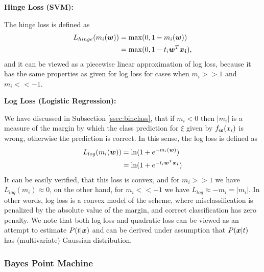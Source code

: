 {\bf Hinge Loss (SVM):}

The hinge loss is defined as
\[ \begin{split}
L_{hinge}(m_i(\boldsymbol{w})) &= \max(0, 1 - m_i(\boldsymbol{w})) \\
&= \max(0, 1 - t_i \boldsymbol{w}^T \boldsymbol{x_i}),
\end{split} \] 
and it can be viewed as a piecewise linear approximation of log loss,
because it has the same properties as given for log loss for cases
when $m_i >> 1$ and $m_i << -1$.

{\bf Log Loss (Logistic Regression):}

We have discussed in Subsection \ref{ssec:binclass}, that if $m_i < 0$
then $|m_i|$ is a measure of the margin by which the class prediction
for $\xi$ given by $f_{\boldsymbol{w}}(x_i)$ is wrong, otherwise the prediction is
correct. In this sense, the log loss is defined as
\[ \begin{split}
L_{log}(m_i(\boldsymbol{w})) &= \ln (1 + e^{-m_i(\boldsymbol{w})}) \\
 &= \ln (1 + e^{-t_i\boldsymbol{w}^T\boldsymbol{x_i}}) 
\end{split} \] 
It can be easily verified, that this loss is convex, and for $m_i >>
1$ we have $L_{log}(m_i) \approx 0$, on the other hand, for $m_i <<
-1$ we have $L_{log} \approx -m_i = |m_i|$. In other words, log loss
is a convex model of the scheme, where misclassification is penalized
by the absolute value of the margin, and correct classification has
zero penalty. We note that both log loss and quadratic loss can be
viewed as an attempt to estimate $P(t|\boldsymbol{x})$ and can be derived under
assumption that $P(\boldsymbol{x}|t)$ has (multivariate) Gaussian distribution.

\ENDCOMMENT


\COMMENT

\subsubsection{Bayes Point Machine}

